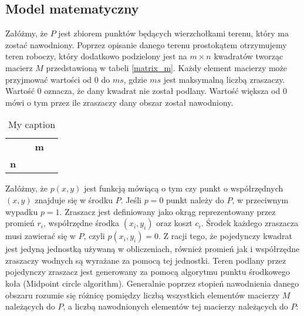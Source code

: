 \documentclass[twoside]{iisthesis}
\begin{document}
\subsection{Model matematyczny}
Załóżmy, że $P$ jest zbiorem punktów będących wierzchołkami terenu, który ma zostać nawodniony. Poprzez opisanie danego terenu prostokątem otrzymujemy teren roboczy, który dodatkowo podzielony jest na $m \times n$ kwadratów tworząc macierz $M$ przedstawioną w tabeli \eqref{matrix_m}. Każdy element macierzy może przyjmować wartości od 0 do $ms$, gdzie $ms$ jest maksymalną liczbą zraszaczy. Wartość 0 oznacza, że dany kwadrat nie został podlany. Wartość większa od 0 mówi o tym przez ile zraszaczy dany obszar został nawodniony.
\begin{table}[]
\centering
\caption{My caption}
\label{matrix_m}
\begin{tabular}{cllll}
\multicolumn{1}{l}{} & \multicolumn{4}{c}{\textbf{m}} \\ \cline{2-5} 
\multicolumn{1}{c|}{\multirow{4}{*}{\textbf{n}}} & \multicolumn{1}{l|}{} & \multicolumn{1}{l|}{} & \multicolumn{1}{l|}{} & \multicolumn{1}{l|}{} \\ \cline{2-5} 
\multicolumn{1}{c|}{} & \multicolumn{1}{l|}{} & \multicolumn{1}{l|}{} & \multicolumn{1}{l|}{} & \multicolumn{1}{l|}{} \\ \cline{2-5} 
\multicolumn{1}{c|}{} & \multicolumn{1}{l|}{} & \multicolumn{1}{l|}{} & \multicolumn{1}{l|}{} & \multicolumn{1}{l|}{} \\ \cline{2-5} 
\multicolumn{1}{c|}{} & \multicolumn{1}{l|}{} & \multicolumn{1}{l|}{} & \multicolumn{1}{l|}{} & \multicolumn{1}{l|}{} \\ \cline{2-5} 
\end{tabular}
\end{table}
Załóżmy, że $p(x,y)$ jest funkcją mówiącą o tym czy punkt o współrzędnych $(x, y)$ znajduje się w środku $P$. Jeśli $p = 0$ punkt należy do $P$, w przeciwnym wypadku $p=1$. Zraszacz jest definiowany jako okrąg reprezentowany przez promień $r_{i}$, współrzędne środka $(x_i, y_i)$ oraz koszt $c_{i}$. Środek każdego zraszacza musi zawierać się w $P$, czyli $p(x_{i}, y_{i}) = 0$. Z racji tego, że pojedynczy kwadrat jest jedyną jednostką używaną w obliczeniach, również promień jak i współrzędne zraszaczy wodnych są wyrażane za pomocą tej jednostki. Teren podlany przez pojedynczy zraszacz jest generowany za pomocą algorytmu punktu środkowego koła (Midpoint circle algorithm).
Generalnie poprzez stopień nawodnienia danego obszaru rozumie się różnicę pomiędzy liczbą wszystkich elementów macierzy $M$ należących do $P$, a liczbą nawodnionych elementów tej macierzy należących do $P$:
\end{document}
